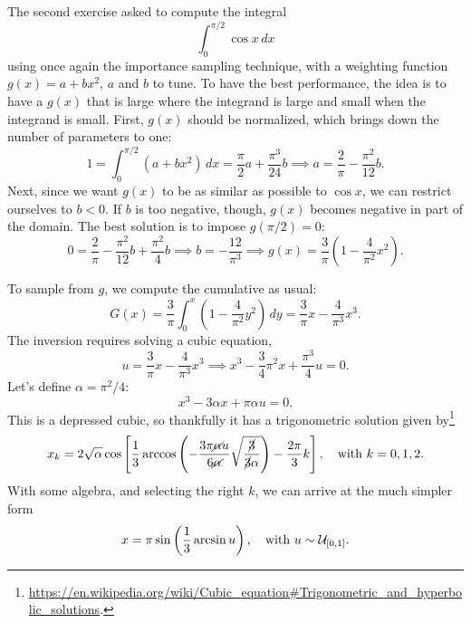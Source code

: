 \documentclass{gulartcl}
\begin{document}
The second exercise asked to compute the integral
\begin{equation}
    \int_{0}^{\pi/2} \cos x \, dx
\end{equation}
using once again the importance sampling technique, with a weighting function
$g(x) = a + bx^2$, $a$ and $b$ to tune. To have the best performance, the idea
is to have a $g(x)$ that is large where the integrand is large and small when
the integrand is small. First, $g(x)$ should be normalized, which brings down the
number of parameters to one:
\begin{equation}
    1 = \int_{0}^{\pi/2} (a + bx^{2})\, dx = \frac{\pi}{2}a +
    \frac{\pi^{3}}{24}b \implies a = \frac{2}{\pi} - \frac{\pi^{2}}{12}b.
\end{equation}
Next, since we want $g(x)$ to be as similar as possible to $\cos x$, we can
restrict ourselves to $b < 0$. If $b$ is too negative, though, $g(x)$ becomes
negative in part of the domain. The best solution is to impose $g(\pi/2) = 0$:
\begin{equation}
    0 = \frac{2}{\pi} - \frac{\pi^{2}}{12}b + \frac{\pi^{2}}{4}b
    \implies b = -\frac{12}{\pi^{3}}
    \implies g(x) = \frac{3}{\pi}\left(1 - \frac{4}{\pi^{2}}x^{2}\right).
\end{equation}

To sample from $g$, we compute the cumulative as usual:
\begin{equation}
    G(x) = \frac{3}{\pi} \int_{0}^{x} \left(1 - \frac{4}{\pi^{2}}y^{2}\right)\,
    dy = \frac{3}{\pi}x - \frac{4}{\pi^{3}}x^{3}.
\end{equation}
The inversion requires solving a cubic equation,
\begin{equation}
    u = \frac{3}{\pi} x - \frac{4}{\pi^{3}}x^{3}
    \implies x^{3} - \frac{3}{4} \pi^{2}x + \frac{\pi^{3}}{4} u = 0.
\end{equation}
Let’s define $\alpha = \pi^{2}/4$:
\begin{equation}
    x^{3} - 3\alpha x + \pi \alpha u = 0.
\end{equation}
This is a depressed cubic, so thankfully it has a trigonometric solution given
by\footnote{\url{https://en.wikipedia.org/wiki/Cubic_equation\#Trigonometric_and_hyperbolic_solutions}.}
\begin{equation}
    x_k = 2 \sqrt{\alpha}
    \cos\left[\frac{1}{3}\arccos\left(-\frac{3\pi\cancel{\alpha}
    u}{6\cancel{\alpha}} \sqrt{\frac{\cancel{3}}{\cancel{3}\alpha}}\right) -
    \frac{2\pi}{3}k \right], \quad \text{with } k = 0, 1, 2.
\end{equation}
With some algebra, and selecting the right $k$, we can arrive at the much simpler form
\begin{equation}
    x = \pi \sin\left(\frac{1}{3} \arcsin u\right), \quad
    \text{with } u \sim \mathcal{U}_{[0, 1]}.
    \label{eq:x~a+bx2}
\end{equation}
\end{document}
